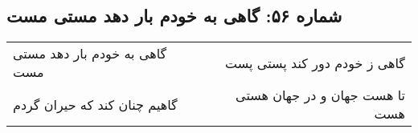 \begin{center}
\section*{شماره ۵۶: گاهی به خودم بار دهد مستی مست}
\label{sec:056}
\begin{longtable}{l p{0.5cm} r}
گاهی به خودم بار دهد مستی مست
&&
گاهی ز خودم دور کند پستی پست
\\
گاهیم چنان کند که حیران گردم
&&
تا هست جهان و در جهان هستی هست
\\
\end{longtable}
\end{center}
